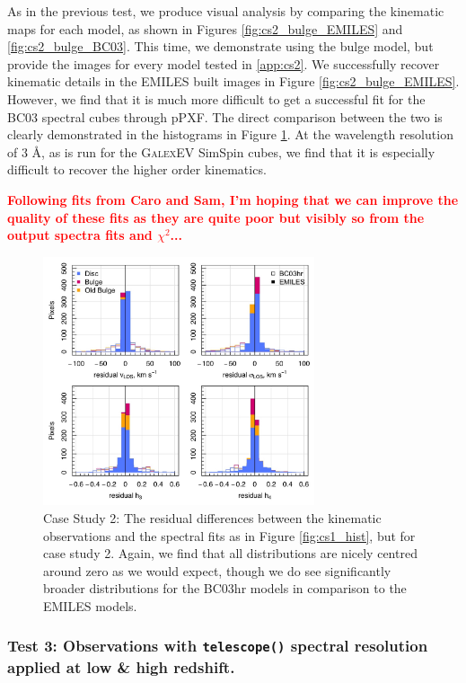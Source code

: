 \documentclass[
  journal=pasa,
  manuscript=research-paper, %
  year=2020,
  volume=37,
]{cup-journal}
\newcommand{\telescope}[1]{\texttt{telescope()}#1}
\newcommand{\br}[1]{\textcolor{red}{\textbf{#1}}}
\begin{document}
As in the previous test, we produce visual analysis by comparing the kinematic maps for each model, as shown in Figures \ref{fig:cs2_bulge_EMILES} and \ref{fig:cs2_bulge_BC03}.
This time, we demonstrate using the bulge model, but provide the images for every model tested in \ref{app:cs2}.
We successfully recover kinematic details in the EMILES built images in Figure \ref{fig:cs2_bulge_EMILES}.  
However, we find that it is much more difficult to get a successful fit for the BC03 spectral cubes through pPXF. 
The direct comparison between the two is clearly demonstrated in the histograms in Figure \ref{fig:cs2_hist}.
At the wavelength resolution of 3 \AA, as is run for the \textsc{GalexEV} SimSpin cubes, we find that it is especially difficult to recover the higher order kinematics.

\br{Following fits from Caro and Sam, I'm hoping that we can improve the quality of these fits as they are quite poor but visibly so from the output spectra fits and $\chi^2$...}

\begin{figure}
    \centering
    \includegraphics[keepaspectratio, width=8cm]{Figures/cs2_histograms.jpeg}
    \caption{Case Study 2: The residual differences between the kinematic observations and the spectral fits as in Figure \ref{fig:cs1_hist}, but for case study 2. Again, we find that all distributions are nicely centred around zero as we would expect, though we do see significantly broader distributions for the BC03hr models in comparison to the EMILES models.}
    \label{fig:cs2_hist}
\end{figure}

\subsubsection*{Test 3: Observations with \telescope{} spectral resolution applied at low \& high redshift. \\ }
\end{document}
